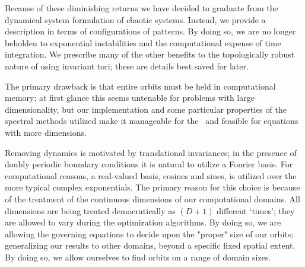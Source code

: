 Because of these diminishing returns we have decided to graduate from the dynamical system formulation
of chaotic systems. Instead, we provide a description in terms of configurations of {\spt} patterns. 
By doing so, we are no longer beholden to exponential instabilities and the computational expense
of time integration. We prescribe many of the other benefits to 
the topologically robust nature of using invariant tori; these are details best saved for later. 

The primary drawback is that entire orbits must be held in computational memory; at first glance this
seems untenable for problems with large dimensionality, but our implementation and some particular 
properties of the spectral methods utilized make it manageable for the \KSe\ 
and feasible for equations with more dimensions. 

Removing dynamics is motivated by translational invariances; in the presence of doubly periodic boundary
conditions it is natural to utilize a Fourier basis. For computational reasons, a real-valued basis, cosines and
sines, is utilized over the more typical complex exponentials. The primary reason for this choice is because
of the treatment of the continuous dimensions of our {\spt} computational domains. 
All dimensions are being treated democratically as $(D+1)$ different `times'; they are allowed to 
vary during the optimization algorithms. By doing so, we are allowing the governing equations
to decide upon the "proper" size of our orbits; generalizing our results to other domains, 
beyond a specific fixed spatial extent. By doing so, we allow ourselves to find orbits on a range
of {\spt} domain sizes. 

